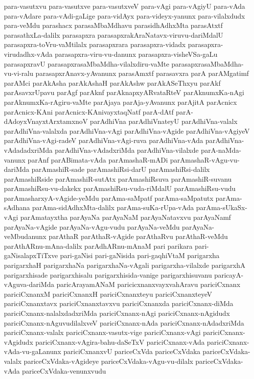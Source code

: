 {para-vasutxvu
para-vasutxve
para-vasutxveV
para-vAgi
para-vAgiyU
para-vAda
para-vAdare
para-vAdi-gaLige
para-vidAyx
para-videyx-yanunx
para-vilalxdudx
para-veMdu
parashacx
parasaMbaMdhavu
parasidhAdhxMta
parasAtxtf
parasathxLa-dalilx
parasapxra
parasapxrakAraNatavx-viruvu-dariMdalU
parasapxra-toVru-vaMtilalx
parasapxrara
parasapxra-vidadx
parasapxra-virudadhx-vAda
parasapxra-viru-vu-danunx
parasapxra-visheVSa-gaLu
parasapxravU
parasapxrasaMbaMdha-vilalxdiru-vaMte
parasapxrasaMbaMdha-vu-vi-ralu
parasapxrAnavx-yAvanunx
parasAmxtf
parasavxra
parA
parAMgatimf
parAMci
parAkAsha
parAkAshaH
parAkAshw
parAkASeThxyu
parAkf
parAsavxrUpavu
parAgf
parAknf
parAknapxyARvataRteV
parAknumxKa-nAgi
parAknumxKa-rAgiru-vaMte
parAjaya
parAja-yAvanunx
parAjitA
parAcnicx
parAcnicx-KAni
parAcnicx-KAnivayxtaqNatf
parA-dAtf
parA-dAdoyxVnayxtArxtamxnoV
parAdhiVna
parAdhiVnateyU
parAdhiVna-valalx
parAdhiVna-valalxda
parAdhiVna-vAgi
parAdhiVna-vAgide
parAdhiVna-vAgiyeV
parAdhiVna-vAgi-radeV
parAdhiVna-vAgi-ruva
parAdhiVna-vAda
parAdhiVna-vAdadadxriMda
parAdhiVna-vAdadxriMda
parAdhiVna-vilalxde
parA-naMda-vanunx
parAnf
parABimata-vAda
parAmashaR-mADi
parAmashaR-vAgu-vu-dariMda
parAmashiR-sade
parAmashiRsi-darU
parAmashiRsi-dalilx
parAmashiRside
parAmashiR-sutAtx
parAmashiRsuva
parAmashiR-suvanu
parAmashiRsu-vu-dakekx
parAmashiRsu-vuda-riMdalU
parAmashiRsu-vudu
parAmasharxyA-vAgide-yeMdu
parAma-saMpatf
parAma-saMpatutx
parAma-sAdhana
parAma-sidAdhxMta-dalilx
parAma-suKa-rUpa-vAda
parAma-sUkaSx-vAgi
parAmatayxtha
parAyaNa
parAyaNaM
parAyaNatavxvu
parAyaNamf
parAyaNa-vAgide
parAyaNa-vAgu-vudu
parAyaNa-veMdu
parAyaNa-veMbudanunx
parAthaR
parAthaR-vAgide
parAthaRvu
parAthaR-veMdu
parAthARnu-mAna-dalilx
parAdhARnu-mAnaM
pari
parikara
pari-gaNisalapxTiTxve
pari-gaNisi
pari-gaNisida
pari-gaqhiVtaM
parigarxha
parigarxhaH
parigarxhaNa
parigarxhaNa-vAgali
parigarxha-vilalxde
parigarxhA
parigarxhisade
parigarxhisalu
parigarxhisida-vanige
parigarxhisuvanu
paricayA-vAguva-dariMda
paricArayamANaM
paricicxnanxvayxvahAravu
pariciCxnanx
pariciCxnanxM
pariciCxnanxH
pariciCxnanxteyu
pariciCxnanxteyeV
pariciCxnanxtavx
pariciCxnanxtavxvu
pariciCxnanxda
pariciCxnanx-diMda
pariciCxnanx-nalalxdadxriMda
pariciCxnanx-nAgi
pariciCxnanx-nAgidudx
pariciCxnanx-nAguvudilalxveV
pariciCxnanx-nAda
pariciCxnanx-nAdadxriMda
pariciCxnanx-valalx
pariciCxnanx-vasutx-vige
pariciCxnanx-vAgi
pariciCxnanx-vAgidudx
pariciCxnanx-vAgira-bahu-daSeTxV
pariciCxnanx-vAda
pariciCxnanx-vAda-vu-gaLanunx
pariciCxnanxvU
pariceCxVda
pariceCxVdaka
pariceCxVdaka-valalx
pariceCxVdaka-vAgideye
pariceCxVdaka-vAgu-vu-dilalx
pariceCxVdaka-vAda
pariceCxVdaka-venunxvudu
}
